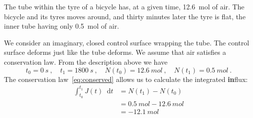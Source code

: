 \documentclass[a4paper,12pt,%
onecolumn,oneside,%
british%
]{memoir}
\newcommand*{\di}{\mathop{}\!\mathrm{d}}%
\renewcommand*{\|}[1][]{\nonscript\:#1\vert\nonscript\:\mathopen{}}
\newcommand*{\yti}{t_{0}}
\newcommand*{\ytf}{t_{1}}
\newcommand*{\dt}{\di t}
\newcommand*{\yN}{N}
\newcommand*{\yJ}{J}
\begin{document}
%
The tube within the tyre of a bicycle has, at a given time, \qty{12.6}{mol} of air.
The bicycle and its tyres moves around, and thirty minutes later the tyre is flat, the inner tube having only \qty{0.5}{mol} of air.

We consider an imaginary, closed control surface wrapping the tube. The control surface deforms just like the tube deforms. We assume that air satisfies a conservation law. From the description above we have
\begin{equation*}
  \yti=\qty{0}{s} \ ,\quad
  \ytf=\qty{1800}{s} \ ,\quad
  \yN(\yti)=\qty{12.6}{mol} \ ,\quad
  \yN(\ytf)=\qty{0.5}{mol} \ .
\end{equation*}
The conservation law~\eqref{eq:conserved} allows us to calculate the integrated \textbf{in}flux:
\begin{equation*}
  \begin{split}
    \int_{\yti}^{\ytf}\!\!\yJ(t)\dt &= \yN(\ytf) - \yN(\yti)
    \\&= \qty{0.5}{mol} - \qty{12.6}{mol}
    \\&= \qty{-12.1}{mol}
  \end{split}
\end{equation*}
\end{document}
